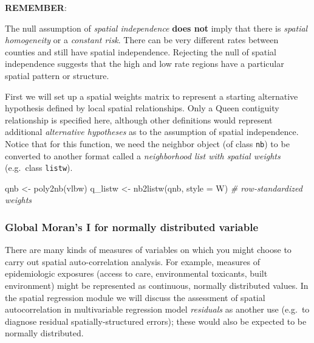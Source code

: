 \documentclass[
]{book}
\newenvironment{Shaded}{\begin{snugshade}}{\end{snugshade}}
\newcommand{\AttributeTok}[1]{\textcolor[rgb]{0.77,0.63,0.00}{#1}}
\newcommand{\CommentTok}[1]{\textcolor[rgb]{0.56,0.35,0.01}{\textit{#1}}}
\newcommand{\FunctionTok}[1]{\textcolor[rgb]{0.00,0.00,0.00}{#1}}
\newcommand{\NormalTok}[1]{#1}
\newcommand{\OtherTok}[1]{\textcolor[rgb]{0.56,0.35,0.01}{#1}}
\newcommand{\StringTok}[1]{\textcolor[rgb]{0.31,0.60,0.02}{#1}}
\newenvironment{rmdnote}[1]
  {
  \begin{itemize}
  \renewcommand{\labelitemi}{
    \raisebox{-.7\height}[0pt][0pt]{
      {\setkeys{Gin}{width=3em,keepaspectratio}\texttt{[image: images/\#1]}}
    }
  }
  \setlength{\fboxsep}{1em}
  \begin{note}
  \item
  }
  {
  \end{note}
  \end{itemize}
  }
\begin{document}
\begin{rmdnote}{note}
\textbf{REMEMBER}:

The null assumption of \emph{spatial independence} \textbf{does not} imply that there is \emph{spatial homogeneity} or a \emph{constant risk}. There can be very different rates between counties and still have spatial independence. Rejecting the null of spatial independence suggests that the high and low rate regions have a particular spatial pattern or structure.

\end{rmdnote}

First we will set up a spatial weights matrix to represent a starting alternative hypothesis defined by local spatial relationships. Only a Queen contiguity relationship is specified here, although other definitions would represent additional \emph{alternative hypotheses} as to the assumption of spatial independence. Notice that for this function, we need the neighbor object (of class \texttt{nb}) to be converted to another format called a \emph{neighborhood list with spatial weights} (e.g.~class \texttt{listw}).

\begin{Shaded}
\begin{Highlighting}[]
\NormalTok{qnb }\OtherTok{\textless{}{-}} \FunctionTok{poly2nb}\NormalTok{(vlbw)}
\NormalTok{q\_listw }\OtherTok{\textless{}{-}} \FunctionTok{nb2listw}\NormalTok{(qnb, }\AttributeTok{style =} \StringTok{\textquotesingle{}W\textquotesingle{}}\NormalTok{) }\CommentTok{\# row{-}standardized weights}
\end{Highlighting}
\end{Shaded}

\hypertarget{global-morans-i-for-normally-distributed-variable}{%
\subsubsection{Global Moran's I for normally distributed variable}\label{global-morans-i-for-normally-distributed-variable}}

There are many kinds of measures of variables on which you might choose to carry out spatial auto-correlation analysis. For example, measures of epidemiologic exposures (access to care, environmental toxicants, built environment) might be represented as continuous, normally distributed values. In the spatial regression module we will discuss the assessment of spatial autocorrelation in multivariable regression model \emph{residuals} as another use (e.g.~to diagnose residual spatially-structured errors); these would also be expected to be normally distributed.
\end{document}
